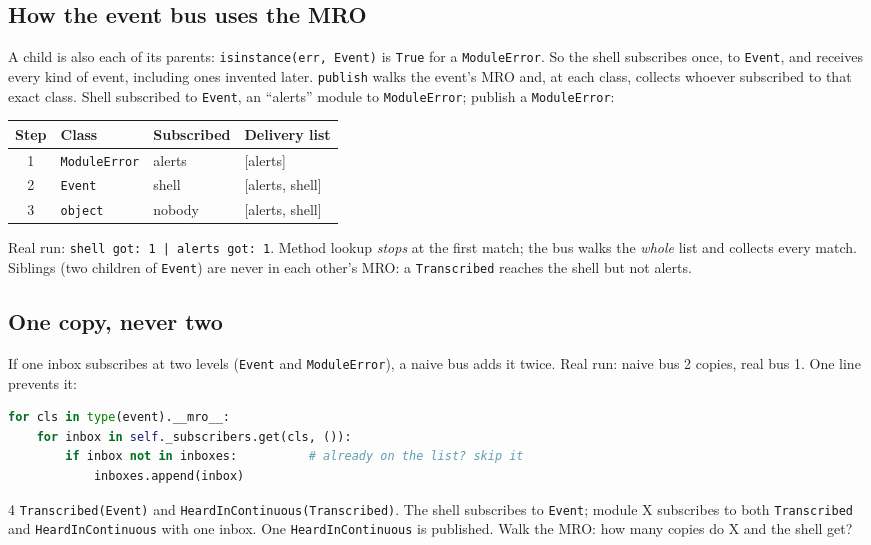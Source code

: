 \documentclass[11pt,a4paper]{article}
\begin{document}
\subsection{How the event bus uses the MRO}
A child is also each of its parents: \texttt{isinstance(err, Event)} is \texttt{True} for a
\texttt{ModuleError}. So the shell subscribes once, to \texttt{Event}, and receives every kind of
event, including ones invented later. \texttt{publish} walks the event's MRO and, at each class,
collects whoever subscribed to that exact class. Shell subscribed to \texttt{Event}, an ``alerts''
module to \texttt{ModuleError}; publish a \texttt{ModuleError}:
\begin{center}
\begin{tabularx}{\textwidth}{c l l X}
\toprule
\textbf{Step} & \textbf{Class} & \textbf{Subscribed} & \textbf{Delivery list} \\
\midrule
1 & \texttt{ModuleError} & alerts & [alerts] \\
2 & \texttt{Event} & shell & [alerts, shell] \\
3 & \texttt{object} & nobody & [alerts, shell] \\
\bottomrule
\end{tabularx}
\end{center}
\noindent Real run: \texttt{shell got: 1 | alerts got: 1}. Method lookup \emph{stops} at the first
match; the bus walks the \emph{whole} list and collects every match. Siblings (two children of
\texttt{Event}) are never in each other's MRO: a \texttt{Transcribed} reaches the shell but not
alerts.

\subsection{One copy, never two}
If one inbox subscribes at two levels (\texttt{Event} and \texttt{ModuleError}), a naive bus adds it
twice. Real run: naive bus 2 copies, real bus 1. One line prevents it:
\begin{lstlisting}[language=Python]
for cls in type(event).__mro__:
    for inbox in self._subscribers.get(cls, ()):
        if inbox not in inboxes:          # already on the list? skip it
            inboxes.append(inbox)
\end{lstlisting}

\begin{quickcheck}{4}
\texttt{Transcribed(Event)} and \texttt{HeardInContinuous(Transcribed)}. The shell subscribes to
\texttt{Event}; module X subscribes to both \texttt{Transcribed} and \texttt{HeardInContinuous}
with one inbox. One \texttt{HeardInContinuous} is published. Walk the MRO: how many copies do X and
the shell get?
\end{quickcheck}
\end{document}

